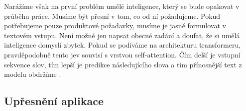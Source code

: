 \documentclass[FM,DP]{tulthesis}
\begin{document}
		Narážíme však na první problém umělé inteligence, který se bude opakovat v průběhu práce. Musíme být přesní v tom, co od ní požadujeme. Pokud potřebujeme pouze produktové požadavky, musíme je jasně formulovat v textovém vstupu. Není možné jen napsat obecné zadání a doufat, že si umělá inteligence domyslí zbytek. Pokud se podíváme na architekturu transformeru, pravděpodobně tento jev souvisí s vrstvou self-attention. Čím delší je vstupní sekvence slov, tím lepší je predikce následujícího slova a tím přínosnější text z modelu obdržíme \cite{rothman2021transformers} \cite{context_understand}.
		
		
		\subsection{Upřesnění aplikace}
		\vspace{0.6em}
\end{document}
